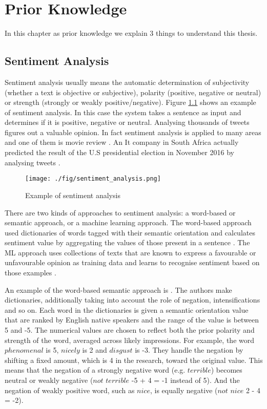 \chapter{Prior Knowledge}
In this chapter as prior knowledge we explain 3 things to understand this thesis.

\section{Sentiment Analysis} \label{sec:sentimen_analysis}
Sentiment analysis usually means the automatic determination of subjectivity (whether a text is objective or subjective), polarity (positive, negative or neutral) or strength (strongly or weakly positive/negative).
Figure \ref{fig:sentiment_analysis} shows an example of sentiment analysis.
In this case the system takes a sentence as input and determines if it is positive, negative or neutral. 
Analysing thousands of tweets figures out a valuable opinion.
In fact sentiment analysis is applied to many areas and one of them is movie review \cite{movie_review}.
An It company in South Africa actually predicted the result of the U.S presidential election in November 2016 by analysing tweets \cite{us_election}.
\begin{figure}
	\centering
	\texttt{[image: ./fig/sentiment\_analysis.png]}
	\caption{Example of sentiment analysis}
	\label{fig:sentiment_analysis}
\end{figure}


There are two kinds of approaches to sentiment analysis: a word-based or semantic approach, or a machine learning approach.
The word-based approach used dictionaries of words tagged with their semantic orientation and calculates sentiment value by aggregating the values of those present in a sentence \cite{Turney}.
The ML approach uses collections of texts that are known to express a favourable or unfavourable opinion as training data and learns to recognise sentiment based on those examples \cite{Pang}.

An example of the word-based semantic approach is \cite{Brooke}.
The authors make dictionaries, additionally taking into account  the role of negation, intensifications and so on.
Each word in the dictionaries is given a semantic orientation value that are ranked by English native speakers and the range of the value is between 5 and -5.
The numerical values are chosen to reflect both the prior polarity and strength of the word, averaged across likely impressions.
For example, the word $phenomenal$ is 5, $nicely$ is 2 and $disgust$ is -3.
They handle the negation by shifting a fixed amount, which is 4 in the research, toward the original value.
This means that the negation of a strongly negative word (e.g. $terrible$) becomes neutral or weakly negative ($not$ $terrible$ -5 + 4 = -1 instead of 5).
And the negation of weakly positive word, such as $nice$, is equally negative ($not$ $nice$ 2 - 4 = -2).


